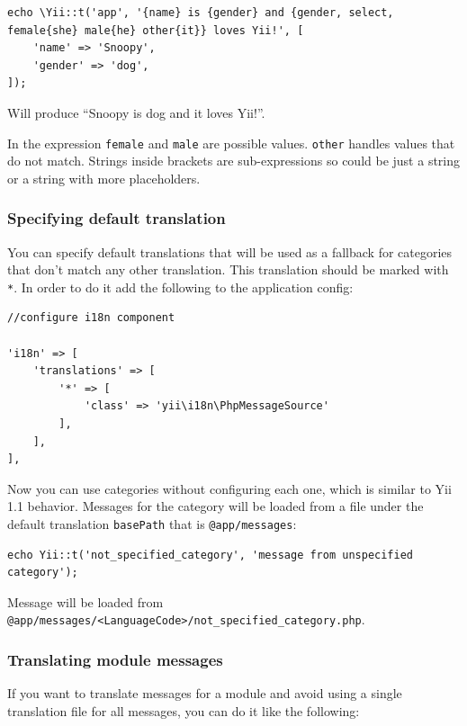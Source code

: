 \lstset{language=php}\begin{lstlisting}
echo \Yii::t('app', '{name} is {gender} and {gender, select, female{she} male{he} other{it}} loves Yii!', [
    'name' => 'Snoopy',
    'gender' => 'dog',
]);
\end{lstlisting}
Will produce ``Snoopy is dog and it loves Yii!''.

In the expression \lstinline|female| and \lstinline|male| are possible values. \lstinline|other| handles values that do not match. Strings inside
brackets are sub-expressions so could be just a string or a string with more placeholders.

\subsubsection{Specifying default translation}
You can specify default translations that will be used as a fallback for categories that don't match any other translation.
This translation should be marked with \lstinline|*|. In order to do it add the following to the application config:

\lstset{language=php}\begin{lstlisting}
//configure i18n component

'i18n' => [
    'translations' => [
        '*' => [
            'class' => 'yii\i18n\PhpMessageSource'
        ],
    ],
],
\end{lstlisting}
Now you can use categories without configuring each one, which is similar to Yii 1.1 behavior.
Messages for the category will be loaded from a file under the default translation \lstinline|basePath| that is \lstinline|@app/messages|:

\lstset{language=php}\begin{lstlisting}
echo Yii::t('not_specified_category', 'message from unspecified category');
\end{lstlisting}
Message will be loaded from \lstinline|@app/messages/<LanguageCode>/not_specified_category.php|.

\subsubsection{Translating module messages}
If you want to translate messages for a module and avoid using a single translation file for all messages, you can do it like the following:

